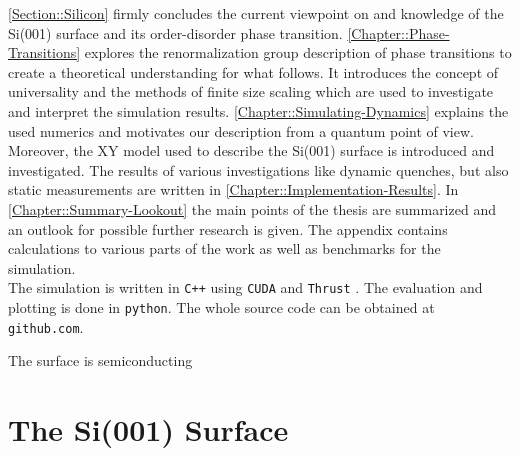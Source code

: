 	\autoref{Section::Silicon} firmly concludes the current viewpoint on and knowledge of the Si(001) surface and its order-disorder phase transition. \autoref{Chapter::Phase-Transitions} explores the renormalization group description of phase transitions to create a theoretical understanding for what follows. It introduces the concept of universality and the methods of finite size scaling which are used to investigate and interpret the simulation results.  \autoref{Chapter::Simulating-Dynamics} explains the used numerics and motivates our description from a quantum point of view. Moreover, the XY model used to describe the Si(001) surface is introduced and investigated. The results of various investigations like dynamic quenches, but also static measurements are written in \autoref{Chapter::Implementation-Results}. In \autoref{Chapter::Summary-Lookout} the main points of the thesis are summarized and an outlook for possible further research is given. The appendix contains calculations to various parts of the work as well as benchmarks for the simulation. \\
	
	The simulation is written in \texttt{C++} using \texttt{CUDA} \cite{cuda} and \texttt{Thrust} \cite{thrust}. The evaluation and plotting is done in \texttt{python}. The whole source code can be obtained at \texttt{github.com}.
	
	The surface is semiconducting \cite{himpsel1979photoemission, uhrberg1981experimental, handa1989plasma} \\
	
	
	\chapter{The Si(001) Surface} \label{Section::Silicon}
